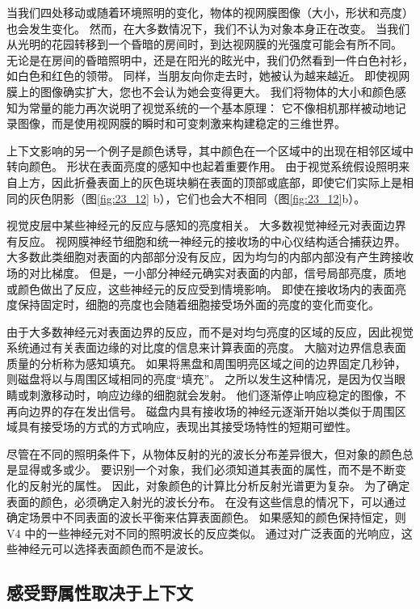 当我们四处移动或随着环境照明的变化，物体的视网膜图像（大小，形状和亮度）也会发生变化。
然而，在大多数情况下，我们不认为对象本身正在改变。 
当我们从光明的花园转移到一个昏暗的房间时，到达视网膜的光强度可能会有所不同。
无论是在房间的昏暗照明中，还是在阳光的眩光中，我们仍然看到一件白色衬衫，如白色和红色的领带。
同样，当朋友向你走去时，她被认为越来越近。
即使视网膜上的图像确实扩大，您也不会认为她会变得更大。
我们将物体的大小和颜色感知为常量的能力再次说明了视觉系统的一个基本原理：
它不像相机那样被动地记录图像，而是使用视网膜的瞬时和可变刺激来构建稳定的三维世界。


上下文影响的另一个例子是颜色诱导，其中颜色在一个区域中的出现在相邻区域中转向颜色。
形状在表面亮度的感知中也起着重要作用。
由于视觉系统假设照明来自上方，因此折叠表面上的灰色斑块躺在表面的顶部或底部，即使它们实际上是相同的灰色阴影（图\ref{fig:23_12}
b），它们也会大不相同（图\ref{fig:23_12}b）。


视觉皮层中某些神经元的反应与感知的亮度相关。 
大多数视觉神经元对表面边界有反应。
视网膜神经节细胞和统一神经元的接收场的中心仪结构适合捕获边界。
大多数此类细胞对表面的内部部分没有反应，因为均匀的内部内部没有产生跨接收场的对比梯度。
但是，一小部分神经元确实对表面的内部，信号局部亮度，质地或颜色做出了反应，这些神经元的反应受到情境影响。
即使在接收场内的表面亮度保持固定时，细胞的亮度也会随着细胞接受场外面的亮度的变化而变化。


由于大多数神经元对表面边界的反应，而不是对均匀亮度的区域的反应，因此视觉系统通过有关表面边缘的对比度的信息来计算表面的亮度。
大脑对边界信息表面质量的分析称为感知填充。
如果将黑盘和周围明亮区域之间的边界固定几秒钟，则磁盘将以与周围区域相同的亮度“填充”。
之所以发生这种情况，是因为仅当眼睛或刺激移动时，响应边缘的细胞就会发射。
他们逐渐停止响应稳定的图像，不再向边界的存在发出信号。
磁盘内具有接收场的神经元逐渐开始以类似于周围区域具有接受场的方式的方式响应，表现出其接受场特性的短期可塑性。


尽管在不同的照明条件下，从物体反射的光的波长分布差异很大，但对象的颜色总是显得或多或少。
要识别一个对象，我们必须知道其表面的属性，而不是不断变化的反射光的属性。
因此，对象颜色的计算比分析反射光谱更为复杂。
为了确定表面的颜色，必须确定入射光的波长分布。
在没有这些信息的情况下，可以通过确定场景中不同表面的波长平衡来估算表面颜色。
如果感知的颜色保持恒定，则 V4 中的一些神经元对不同的照明波长的反应类似。
通过对广泛表面的光响应，这些神经元可以选择表面颜色而不是波长。


\subsection{感受野属性取决于上下文}

